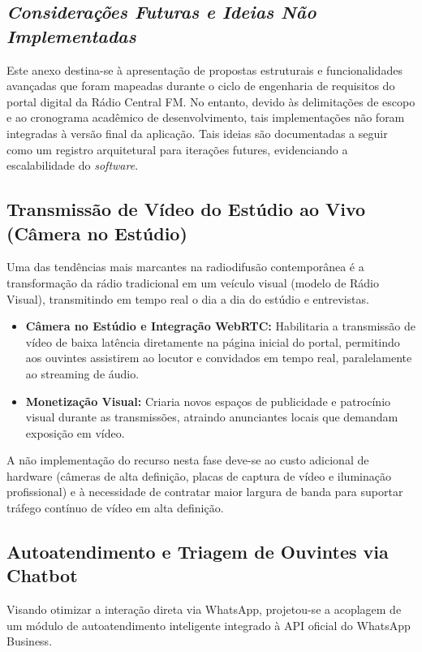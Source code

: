 \documentclass[12pt, openright, oneside, a4paper, brazil]{ads-unipac-abntex2}
\begin{document}
\begin{anexosenv}

\partanexos

\chapter[Considerações Futuras e Ideias Não Implementadas]{\textit{Considerações Futuras e Ideias Não Implementadas}}

Este anexo destina-se à apresentação de propostas estruturais e funcionalidades avançadas que foram mapeadas durante o ciclo de engenharia de requisitos do portal digital da Rádio Central FM. No entanto, devido às delimitações de escopo e ao cronograma acadêmico de desenvolvimento, tais implementações não foram integradas à versão final da aplicação. Tais ideias são documentadas a seguir como um registro arquitetural para iterações futures, evidenciando a escalabilidade do \textit{software}.


\section{Transmissão de Vídeo do Estúdio ao Vivo (Câmera no Estúdio)}
Uma das tendências mais marcantes na radiodifusão contemporânea é a transformação da rádio tradicional em um veículo visual (modelo de Rádio Visual), transmitindo em tempo real o dia a dia do estúdio e entrevistas.

\begin{itemize}
    \item \textbf{Câmera no Estúdio e Integração WebRTC:} Habilitaria a transmissão de vídeo de baixa latência diretamente na página inicial do portal, permitindo aos ouvintes assistirem ao locutor e convidados em tempo real, paralelamente ao streaming de áudio.
    \item \textbf{Monetização Visual:} Criaria novos espaços de publicidade e patrocínio visual durante as transmissões, atraindo anunciantes locais que demandam exposição em vídeo.
\end{itemize}

A não implementação do recurso nesta fase deve-se ao custo adicional de hardware (câmeras de alta definição, placas de captura de vídeo e iluminação profissional) e à necessidade de contratar maior largura de banda para suportar tráfego contínuo de vídeo em alta definição.

\section{Autoatendimento e Triagem de Ouvintes via Chatbot}
Visando otimizar a interação direta via WhatsApp, projetou-se a acoplagem de um módulo de autoatendimento inteligente integrado à API oficial do WhatsApp Business.


\end{anexosenv}
\end{document}
